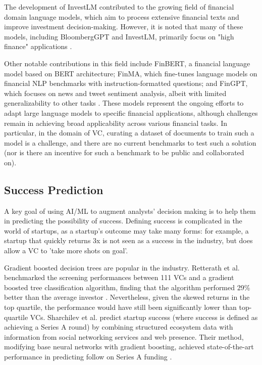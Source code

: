 \documentclass[a4paper, oneside]{discothesis}
\begin{document}
The development of InvestLM contributed to the growing field of financial domain language models, which aim to process extensive financial texts and improve investment decision-making. However, it is noted that many of these models, including BloombergGPT and InvestLM, primarily focus on "high finance" applications \cite{yang2023investlm}.

Other notable contributions in this field include FinBERT, a financial language model based on BERT architecture; FinMA, which fine-tunes language models on financial NLP benchmarks with instruction-formatted questions; and FinGPT, which focuses on news and tweet sentiment analysis, albeit with limited generalizability to other tasks \cite{araci2019finbert, xie2023pixiulargelanguagemodel, yang2023fingpt}. These models represent the ongoing efforts to adapt large language models to specific financial applications, although challenges remain in achieving broad applicability across various financial tasks. In particular, in the domain of VC, curating a dataset of documents to train such a model is a challenge, and there are no current benchmarks to test such a solution (nor is there an incentive for such a benchmark to be public and collaborated on).  

\subsection{Success Prediction}

A key goal of using AI/ML to augment analysts' decision making is to help them in predicting the possibility of success. Defining success is complicated in the world of startups, as a startup's outcome may take many forms: for example, a startup that quickly returns 3x is not seen as a success in the industry, but does allow a VC to 'take more shots on goal'. 

Gradient boosted decision trees are popular in the industry. Retterath et al. benchmarked the screening performances between 111 VCs and a gradient boosted tree classification algorithm, finding that the algorithm performed 29\% better than the average investor \cite{retterath2020human}. Nevertheless, given the skewed returns in the top quartile, the performance would have still been significantly lower than top-quartile VCs.
Sharchilev et al. predict startup success (where success is defined as achieving a Series A round) by combining structured ecosystem data with information from social networking services and web presence. Their method, modifying base neural networks with gradient boosting, achieved state-of-the-art performance in predicting follow on Series A funding \cite{sharchilev2018web}.
\end{document}
